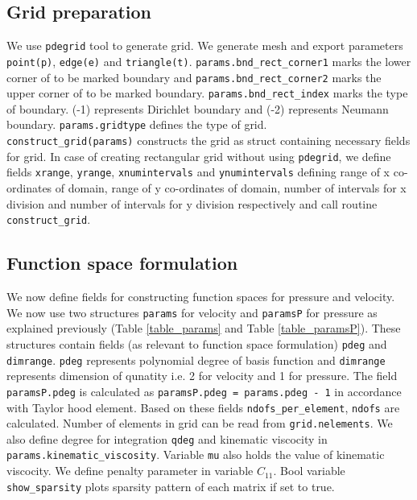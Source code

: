 \documentclass[a4paper,twoside,openright]{book}
\begin{document}
\subsection{Grid preparation}

We use \verb|pdegrid| tool to generate grid. We generate mesh and export parameters \verb|point(p)|, \verb|edge(e)| and \verb|triangle(t)|. \verb|params.bnd_rect_corner1| marks the lower corner of to be marked boundary and \verb|params.bnd_rect_corner2| marks the upper corner of to be marked boundary. \verb|params.bnd_rect_index| marks the type of boundary. (-1) represents Dirichlet boundary and (-2) represents Neumann boundary. \verb|params.gridtype| defines the type of grid. \\

\verb|construct_grid(params)| constructs the grid as struct containing necessary fields for grid. In case of creating rectangular grid without using \verb|pdegrid|, we define fields \verb|xrange|, \verb|yrange|, \verb|xnumintervals| and \verb|ynumintervals| defining range of x co-ordinates of domain, range of y co-ordinates of domain, number of intervals for x division and number of intervals for y division respectively and call routine \verb|construct_grid|.

\subsection{Function space formulation}

We now define fields for constructing function spaces for pressure and velocity. We now use two structures \verb|params| for velocity and \verb|paramsP| for pressure as explained previously (Table \ref{table_params} and Table \ref{table_paramsP}). These structures contain fields (as relevant to function space formulation) \verb|pdeg| and \verb|dimrange|. \verb|pdeg| represents polynomial degree of basis function and \verb|dimrange| represents  dimension of qunatity i.e. 2 for velocity and 1 for pressure. The field \verb|paramsP.pdeg| is calculated as \verb|paramsP.pdeg = params.pdeg - 1| in accordance with Taylor hood element. Based on these fields \verb|ndofs_per_element|, \verb|ndofs| are calculated. Number of elements in grid can be read from \verb|grid.nelements|. We also define degree for integration \verb|qdeg| and kinematic viscocity in \verb|params.kinematic_viscosity|. Variable \verb|mu| also holds the value of kinematic viscocity. We define penalty parameter in variable $C_{11}$. Bool variable \verb|show_sparsity| plots sparsity pattern of each matrix if set to true.\\
\end{document}
